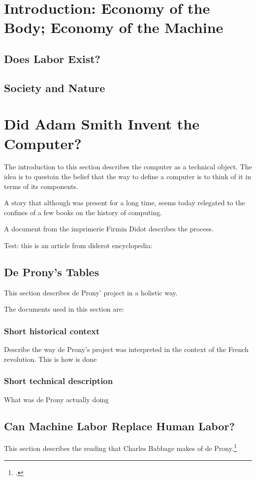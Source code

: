 \documentclass[version=last,draft=true,paper=A4,portrait,twoside=true,twocolumn=false,headinclude=false,footinclude=false,fontsize=11,BCOR=20mm,DIV=calc,pagesize=auto,titlepage=firstiscover,mpinclude=false,open=right,chapterprefix=true,numbers=autoendperiod,headsepline=false,parskip=false]{scrbook}
\begin{document}
\lipsum
\mainmatter
\pagestyle{scrheadings}
\chapter{Introduction: Economy of the Body; Economy of the Machine}
\label{sec:org11891c9}
\section{Does Labor Exist?}
\label{sec:orgeba2809}

\section{Society and Nature}
\label{sec:org91aa5eb}
\chapter{Did Adam Smith Invent the Computer?}
\label{sec:org31178cd}
The introduction to this section describes the computer as a technical
object. The idea is to questoin the belief that the way to define a
computer is to think of it in terms of its components. 

A story that although was present for a long time, seems today relegated to
the confines of a few books on the history of computing. 

A document from the imprimerie Firmin Didot describes the process.

Test: this is an article from diderot encyclopedia:

\section{De Prony's Tables}
\label{sec:org245fb32}
This section describes de Prony' project in a holistic way. 

The documents used in this section are:

\subsection{Short historical context}
\label{sec:orgd3bde78}
Describe the way de Prony's project was interpreted in the context of the
French revolution. This is how is done 
\subsection{Short technical description}
\label{sec:org7d2d608}
What was de Prony actually doing
\section{Can Machine Labor Replace Human Labor?}
\label{sec:org8b8a21a}
This section describes the reading that Charles Babbage makes of de Prony.\footcite{babbage1832}
\end{document}
